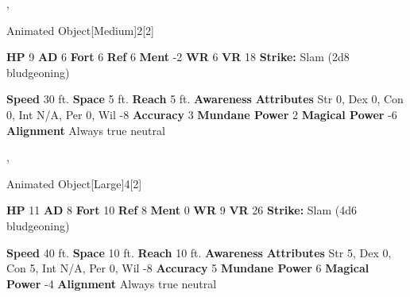   ,
  \begin{monsubsection}{Animated Object}[Medium]{2}[2]
    \vspace{-1em}\vspace{-1em}
    \vspace{0em}

    
    

    \begin{spellcontent}
      \begin{spelltargetinginfo}
        \pari \textbf{HP} 9 \monsep
          \textbf{AD} 6 \monsep
          \textbf{Fort} 6 \monsep
          \textbf{Ref} 6 \monsep
          \textbf{Ment} -2
        \pari \textbf{WR} 6 \monsep
        \textbf{VR} 18
        \pari \textbf{Strike:}
            Slam  (2d8 bludgeoning)
      \end{spelltargetinginfo}
    \end{spellcontent}
    \begin{monsterfooter}
      \pari \textbf{Speed} 30 ft. \monsep
        \textbf{Space} 5 ft. \monsep
        \textbf{Reach} 5 ft.
      \pari \textbf{Awareness} 
      \pari \textbf{Attributes}
        Str 0, Dex 0,
        Con 0, Int N/A,
        Per 0, Wil -8
      \pari \textbf{Accuracy} 3 \monsep
        \textbf{Mundane Power} 2 \monsep
      \textbf{Magical Power} -6
      \pari \textbf{Alignment} Always true neutral
    \end{monsterfooter}
  \end{monsubsection}
  
  ,
  \begin{monsubsection}{Animated Object}[Large]{4}[2]
    \vspace{-1em}\vspace{-1em}
    \vspace{0em}

    
    

    \begin{spellcontent}
      \begin{spelltargetinginfo}
        \pari \textbf{HP} 11 \monsep
          \textbf{AD} 8 \monsep
          \textbf{Fort} 10 \monsep
          \textbf{Ref} 8 \monsep
          \textbf{Ment} 0
        \pari \textbf{WR} 9 \monsep
        \textbf{VR} 26
        \pari \textbf{Strike:}
            Slam  (4d6 bludgeoning)
      \end{spelltargetinginfo}
    \end{spellcontent}
    \begin{monsterfooter}
      \pari \textbf{Speed} 40 ft. \monsep
        \textbf{Space} 10 ft. \monsep
        \textbf{Reach} 10 ft.
      \pari \textbf{Awareness} 
      \pari \textbf{Attributes}
        Str 5, Dex 0,
        Con 5, Int N/A,
        Per 0, Wil -8
      \pari \textbf{Accuracy} 5 \monsep
        \textbf{Mundane Power} 6 \monsep
      \textbf{Magical Power} -4
      \pari \textbf{Alignment} Always true neutral
    \end{monsterfooter}
  \end{monsubsection}
  
